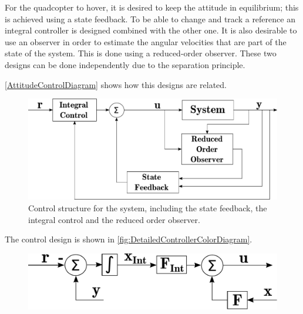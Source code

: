For the quadcopter to hover, it is desired to keep the attitude in equilibrium; this is achieved using a state feedback. To be able to change and track a reference an integral controller is designed combined with the other one. It is also desirable to use an observer in order to estimate the angular velocities that are part of the state of the system. This is done using a reduced-order observer. These two designs can be done independently due to the separation principle. \cite{ssReference}

\autoref{AttitudeControlDiagram} shows how this designs are related.

\begin{figure}[H]
    \centering
    \includegraphics[scale=0.25]{figures/AttitudeControlDiagram}
    \caption{ Control structure for the system, including the state feedback, the integral control and the reduced order observer.}
    \label{AttitudeControlDiagram}
\end{figure}

The control design is shown in \autoref{fig:DetailedControllerColorDiagram}.
\begin{figure}[H]
    \includegraphics[scale=.35]{figures/DetailedControllerColorDiagram}
    \centering
    \label{fig:DetailedControllerColorDiagram}
\end{figure}

